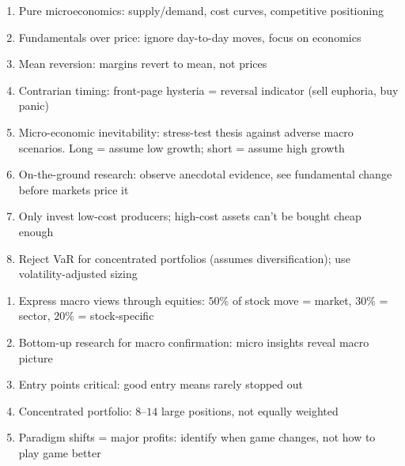 \begin{remark} 
\begin{enumerate}[label=\roman*.]
\setlength{\itemsep}{0pt}
\item Pure microeconomics: supply/demand, cost curves, competitive positioning
\item Fundamentals over price: ignore day-to-day moves, focus on economics
\item Mean reversion: margins revert to mean, not prices
\item Contrarian timing: front-page hysteria = reversal indicator (sell euphoria, buy panic)
\item Micro-economic inevitability: stress-test thesis against adverse macro scenarios. Long = assume low growth; short = assume high growth
\item On-the-ground research: observe anecdotal evidence, see fundamental change before markets price it
\item Only invest low-cost producers; high-cost assets can't be bought cheap enough
\item Reject VaR for concentrated portfolios (assumes diversification); use volatility-adjusted sizing
\end{enumerate}
\end{remark}

\begin{remark} 
\begin{enumerate}[label=\roman*.]
\setlength{\itemsep}{0pt}
\item Express macro views through equities: $50\%$ of stock move = market, $30\%$ = sector, $20\%$ = stock-specific
\item Bottom-up research for macro confirmation: micro insights reveal macro picture
\item Entry points critical: good entry means rarely stopped out
\item Concentrated portfolio: $8$--$14$ large positions, not equally weighted
\item Paradigm shifts = major profits: identify when game changes, not how to play game better
\end{enumerate}
\end{remark}

